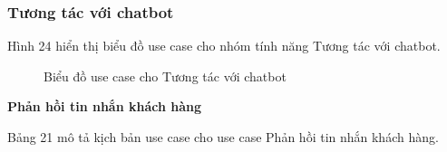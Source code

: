 \subsubsection{Tương tác với chatbot}
Hình 24 hiển thị biểu đồ use case cho nhóm tính năng Tương tác với chatbot.
\begin{figure}[H]
    \centering
    
    \vspace{0.5cm}
    \caption{Biểu đồ use case cho Tương tác với chatbot}
    \label{fig:enter-label}
\end{figure}
\textbf{Phản hồi tin nhắn khách hàng}

Bảng 21 mô tả kịch bản use case cho use case Phản hồi tin nhắn khách hàng.


